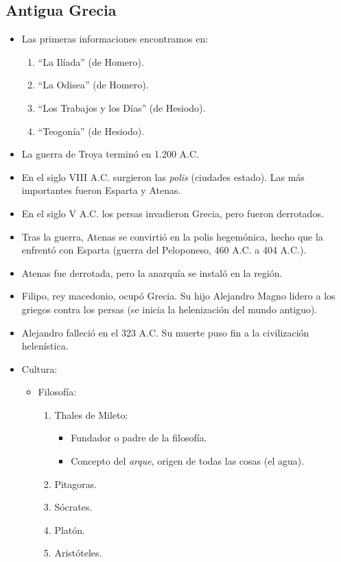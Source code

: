 \subsection{Antigua Grecia}

\begin{itemize}

\item Las primeras informaciones encontramos en:
\begin{enumerate}
	\item ``La Ilíada'' (de Homero).
	\item ``La Odisea'' (de Homero).
	\item ``Los Trabajos y los Días'' (de Hesiodo).
	\item ``Teogonía'' (de Hesiodo).
\end{enumerate}

\item La guerra de Troya terminó en 1.200 A.C.

\item En el siglo VIII A.C. surgieron las \emph{polis} (ciudades estado). Las más importantes fueron Esparta y Atenas.

\item En el siglo V A.C. los persas invadieron Grecia, pero fueron derrotados.

\item Tras la guerra, Atenas se convirtió en la polis hegemónica, hecho que la enfrentó con Esparta (guerra del Peloponeso, 460 A.C. a 404 A.C.).

\item Atenas fue derrotada, pero la anarquía se instaló en la región.

\item Filipo, rey macedonio, ocupó Grecia. Su hijo Alejandro Magno lidero a los griegos contra los persas (se inicia la helenización del mundo antiguo).

\item Alejandro falleció en el 323 A.C. Su muerte puso fin a la civilización helenística.

\item Cultura:

\begin{itemize}

	\item Filosofía:
	\begin{enumerate}
		\item Thales de Mileto:
		\begin{itemize}
			\item Fundador o padre de la filosofía.
			\item Concepto del \emph{arque}, origen de todas las cosas (el agua).
		\end{itemize}
		\item Pitagoras.
		\item Sócrates.
		\item Platón.
		\item Aristóteles.
	\end{enumerate}
	

\end{itemize}
\end{itemize}
